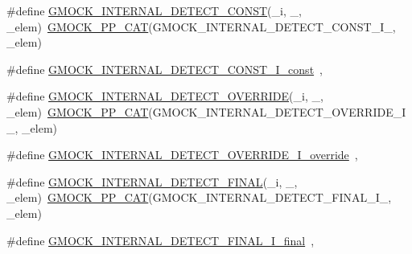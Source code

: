 \begin{DoxyCompactItemize}
\item 
\#define \mbox{\hyperlink{_obj__test_2lib_2googletest-master_2googlemock_2include_2gmock_2gmock-function-mocker_8h_a3db348fab7c9ba65b3c9f4a7c1a9b3cc}{G\+M\+O\+C\+K\+\_\+\+I\+N\+T\+E\+R\+N\+A\+L\+\_\+\+D\+E\+T\+E\+C\+T\+\_\+\+C\+O\+N\+ST}}(\+\_\+i,  \+\_\+,  \+\_\+elem)~\mbox{\hyperlink{_obj__test_2lib_2googletest-master_2googlemock_2include_2gmock_2internal_2gmock-pp_8h_a108c52ffa81ab99348d23b8fa76fded3}{G\+M\+O\+C\+K\+\_\+\+P\+P\+\_\+\+C\+AT}}(G\+M\+O\+C\+K\+\_\+\+I\+N\+T\+E\+R\+N\+A\+L\+\_\+\+D\+E\+T\+E\+C\+T\+\_\+\+C\+O\+N\+S\+T\+\_\+\+I\+\_\+, \+\_\+elem)
\item 
\#define \mbox{\hyperlink{_obj__test_2lib_2googletest-master_2googlemock_2include_2gmock_2gmock-function-mocker_8h_aa7d5cddff91ecb1062f9b09c92e1490b}{G\+M\+O\+C\+K\+\_\+\+I\+N\+T\+E\+R\+N\+A\+L\+\_\+\+D\+E\+T\+E\+C\+T\+\_\+\+C\+O\+N\+S\+T\+\_\+\+I\+\_\+const}}~,
\item 
\#define \mbox{\hyperlink{_obj__test_2lib_2googletest-master_2googlemock_2include_2gmock_2gmock-function-mocker_8h_a78c435d1f1413ad21dce5459ce132ef3}{G\+M\+O\+C\+K\+\_\+\+I\+N\+T\+E\+R\+N\+A\+L\+\_\+\+D\+E\+T\+E\+C\+T\+\_\+\+O\+V\+E\+R\+R\+I\+DE}}(\+\_\+i,  \+\_\+,  \+\_\+elem)~\mbox{\hyperlink{_obj__test_2lib_2googletest-master_2googlemock_2include_2gmock_2internal_2gmock-pp_8h_a108c52ffa81ab99348d23b8fa76fded3}{G\+M\+O\+C\+K\+\_\+\+P\+P\+\_\+\+C\+AT}}(G\+M\+O\+C\+K\+\_\+\+I\+N\+T\+E\+R\+N\+A\+L\+\_\+\+D\+E\+T\+E\+C\+T\+\_\+\+O\+V\+E\+R\+R\+I\+D\+E\+\_\+\+I\+\_\+, \+\_\+elem)
\item 
\#define \mbox{\hyperlink{_obj__test_2lib_2googletest-master_2googlemock_2include_2gmock_2gmock-function-mocker_8h_a291f5cec84814f28b56557f3e2c0623e}{G\+M\+O\+C\+K\+\_\+\+I\+N\+T\+E\+R\+N\+A\+L\+\_\+\+D\+E\+T\+E\+C\+T\+\_\+\+O\+V\+E\+R\+R\+I\+D\+E\+\_\+\+I\+\_\+override}}~,
\item 
\#define \mbox{\hyperlink{_obj__test_2lib_2googletest-master_2googlemock_2include_2gmock_2gmock-function-mocker_8h_a2b0f53a8fea3a79d52582daf294737b0}{G\+M\+O\+C\+K\+\_\+\+I\+N\+T\+E\+R\+N\+A\+L\+\_\+\+D\+E\+T\+E\+C\+T\+\_\+\+F\+I\+N\+AL}}(\+\_\+i,  \+\_\+,  \+\_\+elem)~\mbox{\hyperlink{_obj__test_2lib_2googletest-master_2googlemock_2include_2gmock_2internal_2gmock-pp_8h_a108c52ffa81ab99348d23b8fa76fded3}{G\+M\+O\+C\+K\+\_\+\+P\+P\+\_\+\+C\+AT}}(G\+M\+O\+C\+K\+\_\+\+I\+N\+T\+E\+R\+N\+A\+L\+\_\+\+D\+E\+T\+E\+C\+T\+\_\+\+F\+I\+N\+A\+L\+\_\+\+I\+\_\+, \+\_\+elem)
\item 
\#define \mbox{\hyperlink{_obj__test_2lib_2googletest-master_2googlemock_2include_2gmock_2gmock-function-mocker_8h_a0bc72a48cf71bb605b47e52f94a97dd9}{G\+M\+O\+C\+K\+\_\+\+I\+N\+T\+E\+R\+N\+A\+L\+\_\+\+D\+E\+T\+E\+C\+T\+\_\+\+F\+I\+N\+A\+L\+\_\+\+I\+\_\+final}}~,

\end{DoxyCompactItemize}
